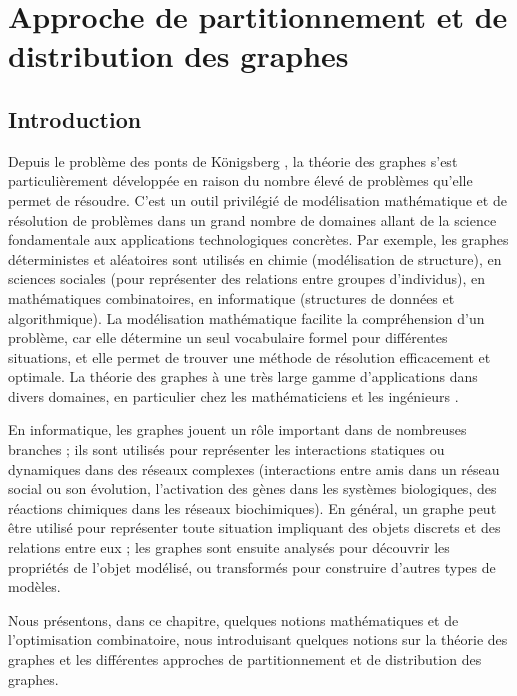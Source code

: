 \chapter{Approche de partitionnement et de distribution des graphes}

\section{Introduction} 
Depuis le problème des ponts de Königsberg \citep{EULER1736}, la théorie des graphes s'est particulièrement développée en raison du nombre élevé de problèmes qu'elle permet de résoudre. C'est un outil privilégié de modélisation mathématique et de résolution de problèmes dans un grand nombre de domaines allant de la science fondamentale aux applications technologiques concrètes. Par exemple, les graphes déterministes et aléatoires sont utilisés en chimie (modélisation de structure), en sciences sociales (pour représenter des relations entre groupes d’individus), en mathématiques combinatoires, en informatique (structures de données et algorithmique). La modélisation mathématique facilite la compréhension d'un problème, car elle détermine un seul vocabulaire formel pour différentes situations, et elle permet de trouver une méthode de résolution efficacement et optimale. La théorie des graphes à une très large gamme d'applications dans divers domaines, en particulier chez les mathématiciens et les ingénieurs \citep{DEO2017}.

En informatique, les graphes jouent un rôle important dans de nombreuses branches ; ils sont utilisés pour représenter les interactions statiques ou dynamiques dans des réseaux complexes (interactions entre amis dans un réseau social ou son évolution, l'activation des gènes dans les systèmes biologiques, des réactions chimiques dans les réseaux biochimiques). En général, un graphe peut être utilisé pour représenter toute situation impliquant des objets discrets et des relations entre eux ; les graphes sont ensuite analysés pour découvrir les propriétés de l'objet modélisé, ou transformés pour construire d'autres types de modèles.

Nous présentons, dans ce chapitre, quelques notions mathématiques et de l'optimisation combinatoire, nous introduisant quelques notions sur la théorie des graphes et les différentes approches de partitionnement et de distribution des graphes. 

